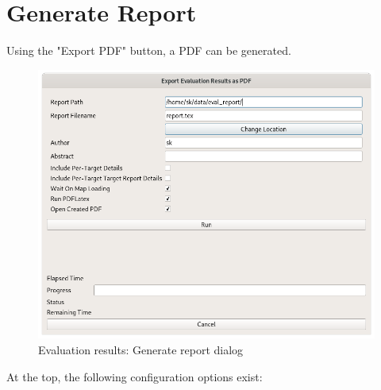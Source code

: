 \section{Generate Report}
\label{sec:eval_report}

Using the "Export PDF" button, a PDF can be generated.

\begin{figure}[H]
    \includegraphics[width=14cm]{../screenshots/eval_report.png}
  \caption{Evaluation results: Generate report dialog}
\end{figure}

At the top, the following configuration options exist:

